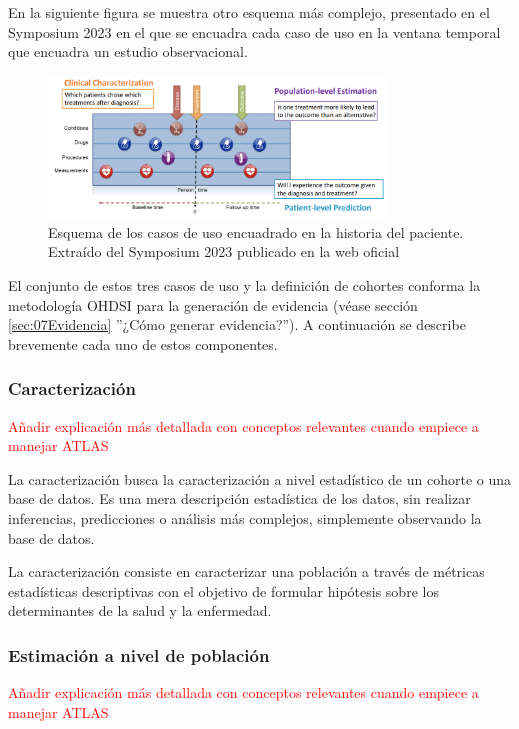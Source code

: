 En la siguiente figura se muestra otro esquema más complejo, presentado en el Symposium 2023 en el que se encuadra cada caso de uso en la ventana temporal que encuadra un estudio observacional.


\begin{figure}[H]
\centering
\includegraphics[width=0.80\textwidth]{figures/useCasesJourney.png}
     \caption{Esquema de los casos de uso encuadrado en la historia del paciente. Extraído del Symposium 2023 publicado en la web oficial \cite{OHDSIwebsite}}
    \label{fig:useCasesJourney}
\end{figure}

El conjunto de estos tres casos de uso y la definición de cohortes conforma la metodología OHDSI para la generación de evidencia (véase sección \ref{sec:07Evidencia} ''¿Cómo generar evidencia?''). A continuación se describe brevemente cada uno de estos componentes. 

\subsubsection{Caracterización}

\textcolor{red}{Añadir explicación más detallada con conceptos relevantes cuando empiece a manejar ATLAS}

La caracterización busca la caracterización a nivel estadístico de un cohorte o una base de datos. Es una mera descripción estadística de los datos, sin realizar inferencias, predicciones o análisis más complejos, simplemente observando la base de datos.

La caracterización consiste en caracterizar una población a través de métricas estadísticas descriptivas con el objetivo de formular hipótesis sobre los determinantes de la salud y la enfermedad.

\subsubsection{Estimación a nivel de población}

\textcolor{red}{Añadir explicación más detallada con conceptos relevantes cuando empiece a manejar ATLAS}

